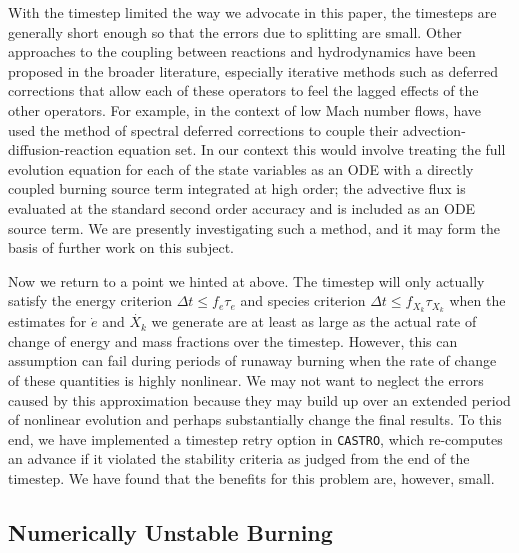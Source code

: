 \documentclass[twocolumn,numberedappendix]{../aastex6}
\newcommand{\castro}{\texttt{CASTRO}}
\begin{document}
With the timestep limited the way we advocate in this paper, 
the timesteps are generally short enough so that the errors 
due to splitting are small. Other approaches to the coupling 
between reactions and hydrodynamics have been proposed in the 
broader literature, especially iterative methods such as 
deferred corrections that allow each of these operators to 
feel the lagged effects of the other operators. For example,
in the context of low Mach number flows, \cite{nonaka:2012} have
used the method of spectral deferred corrections \citep{SDC} to
couple their advection-diffusion-reaction equation set. In our
context this would involve treating the full evolution equation
for each of the state variables as an ODE with a directly coupled
burning source term integrated at high order; the advective
flux is evaluated at the standard second order accuracy
and is included as an ODE source term.
We are presently investigating such a method,
and it may form the basis of further work on this subject.

Now we return to a point we hinted at above. The timestep
will only actually satisfy the energy criterion
$\Delta t \leq f_e \tau_e$ and species criterion
$\Delta t \leq f_{X_k} \tau_{X_k}$ when the estimates for
$\dot{e}$ and $\dot{X_k}$ we generate are at least as large
as the actual rate of change of energy and mass fractions
over the timestep. However, this can assumption can fail
during periods of runaway burning when the rate of change
of these quantities is highly nonlinear. We may not want
to neglect the errors caused by this approximation
because they may build up over an extended period of nonlinear
evolution and perhaps substantially change the final results.
To this end, we have implemented a timestep retry option in
\castro, which re-computes an advance if it violated the
stability criteria as judged from the end of the timestep.
We have found that the benefits for this problem are, however, small.

\subsection{Numerically Unstable Burning}
\label{sec:unstable_burning}
\end{document}
